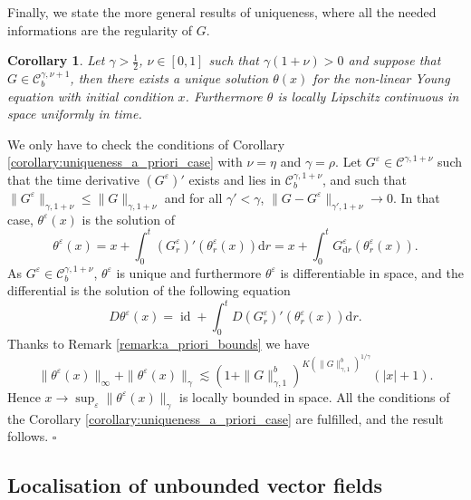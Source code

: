\documentclass[a4paper,11pt]{article}
\newcommand{\mathd}{\mathrm{d}}
\newcommand{\tmop}[1]{\ensuremath{\operatorname{#1}}}
\newtheorem{corollary}[theorem]{Corollary}
\newenvironment{proof}{{\sc Proof.}}{\hfill$\square$}
\newcommand{\CC}{\mathscr C}
\begin{document}
Finally, we state the more general results of uniqueness, where all the needed
informations are the regularity of $G$.

\begin{corollary}
  Let $\gamma > \frac{1}{2}$, $\nu \in [ 0,1 ]$ such that $\gamma ( 1+ \nu )
  >0$ and suppose that $G \in \CC^{\gamma , \nu +1}_{b}$, then there exists a
  unique solution $\theta ( x )$ for the non-linear Young equation with
  initial condition $x$. Furthermore $\theta$ is locally Lipschitz continuous
  in space uniformly in time.
\end{corollary}

\begin{proof}
  We only have to check the conditions of Corollary
  \ref{corollary:uniqueness_a_priori_case} with $\nu = \eta$ and $\gamma =
  \rho$. Let $G^{\varepsilon} \in \CC^{\gamma ,1+ \nu}$ such that the time
  derivative $( G^{\varepsilon} )'$ exists and lies in $\CC^{\gamma ,1+
  \nu}_{b}$, and such that $\| G^{\varepsilon} \|_{\gamma ,1+ \nu} \leqslant
  \| G \|_{\gamma ,1+ \nu}$ and for all $\gamma' < \gamma$, $\|
  G-G^{\varepsilon} \|_{\gamma' ,1+ \nu} \rightarrow 0$. In that case,
  $\theta^{\varepsilon} ( x )$ is the solution of
  \[ \theta^{\varepsilon} ( x ) =x+ \int_{0}^{t} ( G^{\varepsilon}_{r} )' (
     \theta^{\varepsilon}_{r} ( x ) ) \mathd r=x+ \int_{0}^{t}
     G^{\varepsilon}_{\mathd r} ( \theta^{\varepsilon}_{r} ( x ) ) . \]
  As $G^{\varepsilon} \in \CC^{\gamma ,1+ \nu}_{b}$, $\theta^{\varepsilon}$ is
  unique and furthermore $\theta^{\varepsilon}$ is differentiable in space,
  and the differential is the solution of the following equation
  \[ D \theta^{\varepsilon} ( x ) = \tmop{id} + \int_{0}^{t} D (
     G^{\varepsilon}_{r} )' ( \theta^{\varepsilon}_{r} ( x ) ) \mathd r. \]
  Thanks to Remark \ref{remark:a_priori_bounds} we have
  \[ \| \theta^{\varepsilon} ( x ) \|_{\infty} + \| \theta^{\varepsilon} ( x )
     \|_{\gamma} \lesssim ( 1+ \| G \|_{\gamma ,1}^{b} )^{K ( \| G
     \|^{b}_{\gamma ,1} )^{1/ \gamma}} ( | x | +1 ) . \]
  Hence $x \rightarrow \sup_{\varepsilon} \| \theta^{\varepsilon} ( x )
  \|_{\gamma}$ is locally bounded in space. All the conditions of the
  Corollary \ref{corollary:uniqueness_a_priori_case} are fulfilled, and the
  result follows.
\end{proof}

\subsection{Localisation of unbounded vector fields}
\end{document}
